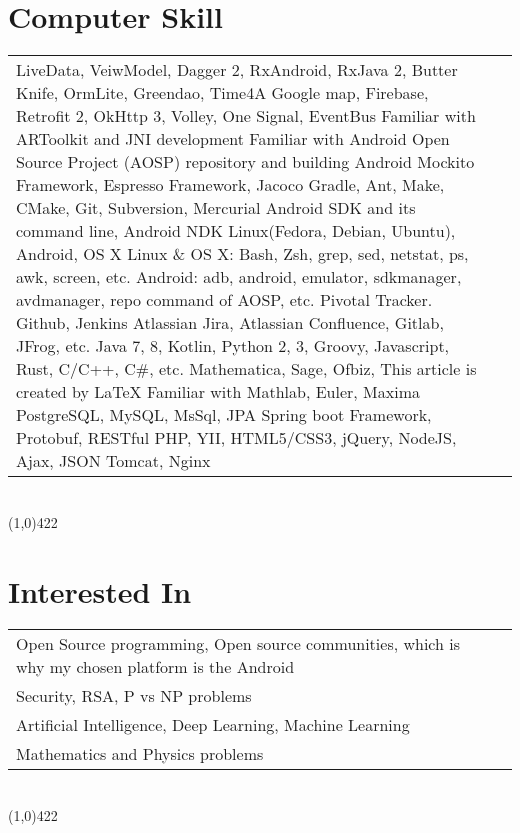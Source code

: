 \documentclass[10pt]{article}
\newcommand\HRule{\hspace*{.8cm}\line(1,0){422}\\}
\newenvironment{Record}[1]
{
    \vspace{-0.5cm}
    \section*{#1}
        \vspace{0.1cm}
        \begin{tabular}
}
{
        \end{tabular}\\
        \HRule
}
\newcommand\subsubsectionstyle{\scriptsize\texttt\subsubsectionfont}
\begin{document}
\begin{Record}{Computer Skill}{l l}
    \ComputerSkill{Android Library}
        {LiveData, VeiwModel, Dagger 2, RxAndroid, RxJava 2, Butter Knife, OrmLite, Greendao, Time4A}
        {Google map, Firebase, Retrofit 2, OkHttp 3, Volley, One Signal, EventBus}
        {Familiar with ARToolkit and JNI development}
        {Familiar with Android Open Source Project (AOSP) repository and building Android}{}%
    \ComputerSkill{Android Test Library}
        {Mockito Framework, Espresso Framework, Jacoco}{}{}{}{}%
    \ComputerSkill{Tool}
        {Gradle, Ant, Make, CMake, Git, Subversion, Mercurial}
        {Android SDK and its command line, Android NDK}{}{}{}%
    \ComputerSkill{Operating System}
        {Linux(Fedora, Debian, Ubuntu), Android, OS X}{}{}{}{}%
    \ComputerSkill{Operating System tool}
        {Linux \& OS X: Bash, Zsh, grep, sed, netstat, ps, awk, screen, etc.}
        {Android: adb, android, emulator, sdkmanager, avdmanager, repo command of AOSP, etc.}{}{}{}%
    \ComputerSkill{Development tool}
        {Pivotal Tracker. Github, Jenkins}
        {Atlassian Jira, Atlassian Confluence, Gitlab, JFrog, etc.}{}{}{}%
    \ComputerSkill{Language}
        {Java 7, 8, Kotlin, Python 2, 3, Groovy, Javascript, Rust, C/C++, C\#, etc.}
        {}{}{}{}%
    \ComputerSkill{Special Software}
        {Mathematica, Sage, Ofbiz, This article is created by \LaTeX}
        {Familiar with Mathlab, Euler, Maxima}{}{}{}%
    \ComputerSkill{Back-End Development}
        {PostgreSQL, MySQL, MsSql, JPA}
        {Spring boot Framework, Protobuf, RESTful}
        {PHP, YII, HTML5/CSS3, jQuery, NodeJS, Ajax, JSON}
        {Tomcat, Nginx}{}%
\end{Record}

\newcommand{\InterestedIn}[1]{
    \subsubsectionstyle #1\\
}
\begin{Record}{Interested In}{l l}
    \InterestedIn{Open Source programming, Open source communities, which is why my chosen platform is the Android}%
    \InterestedIn{Security, RSA, P vs NP problems}%
    \InterestedIn{Artificial Intelligence, Deep Learning, Machine Learning}%
    \InterestedIn{Mathematics and Physics problems}%
\end{Record}

\end{document}
